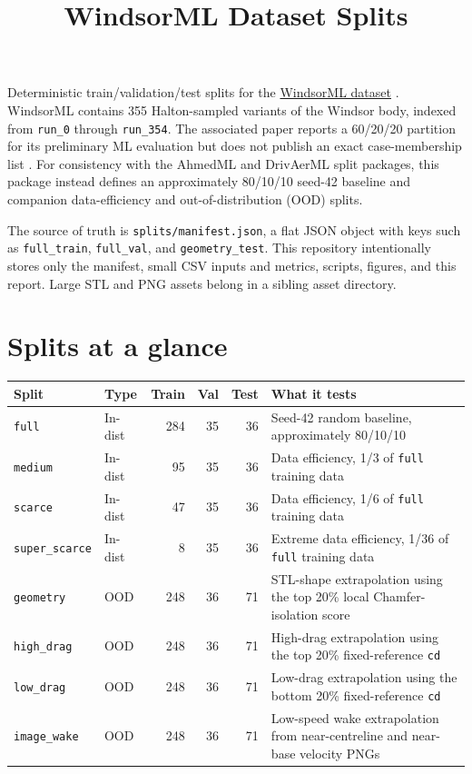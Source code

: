 \documentclass[10pt]{article}
\title{\vspace{-1.2em}\textbf{WindsorML Dataset Splits}}
\author{}
\date{}
\newcommand{\code}[1]{\texttt{#1}}
\newcommand{\splitkey}[1]{\texttt{#1}}
\begin{document}
\maketitle
\vspace{-2.0em}

Deterministic train/validation/test splits for the
\href{https://huggingface.co/datasets/neashton/windsorml}{WindsorML dataset}
\cite{windsorml_dataset}. WindsorML contains 355 Halton-sampled variants of the
Windsor body, indexed from \code{run\_0} through \code{run\_354}. The associated
paper reports a 60/20/20 partition for its preliminary ML evaluation but does
not publish an exact case-membership list \cite{windsorml_paper}. For consistency
with the AhmedML and DrivAerML split packages, this package instead defines an
approximately 80/10/10 seed-42 baseline and companion data-efficiency and
out-of-distribution (OOD) splits.

The source of truth is \code{splits/manifest.json}, a flat JSON object with keys
such as \code{full\_train}, \code{full\_val}, and \code{geometry\_test}. This
repository intentionally stores only the manifest, small CSV inputs and metrics,
scripts, figures, and this report. Large STL and PNG assets belong in a sibling
asset directory.

\section*{Splits at a glance}

\begin{tabularx}{\textwidth}{@{}l l r r r X@{}}
\toprule
Split & Type & Train & Val & Test & What it tests \\
\midrule
\splitkey{full} & In-dist & 284 & 35 & 36 & Seed-42 random baseline, approximately 80/10/10 \\
\splitkey{medium} & In-dist & 95 & 35 & 36 & Data efficiency, 1/3 of \splitkey{full} training data \\
\splitkey{scarce} & In-dist & 47 & 35 & 36 & Data efficiency, 1/6 of \splitkey{full} training data \\
\splitkey{super\_scarce} & In-dist & 8 & 35 & 36 & Extreme data efficiency, 1/36 of \splitkey{full} training data \\
\splitkey{geometry} & OOD & 248 & 36 & 71 & STL-shape extrapolation using the top 20\% local Chamfer-isolation score \\
\splitkey{high\_drag} & OOD & 248 & 36 & 71 & High-drag extrapolation using the top 20\% fixed-reference \code{cd} \\
\splitkey{low\_drag} & OOD & 248 & 36 & 71 & Low-drag extrapolation using the bottom 20\% fixed-reference \code{cd} \\
\splitkey{image\_wake} & OOD & 248 & 36 & 71 & Low-speed wake extrapolation from near-centreline and near-base velocity PNGs \\
\bottomrule
\end{tabularx}
\end{document}
